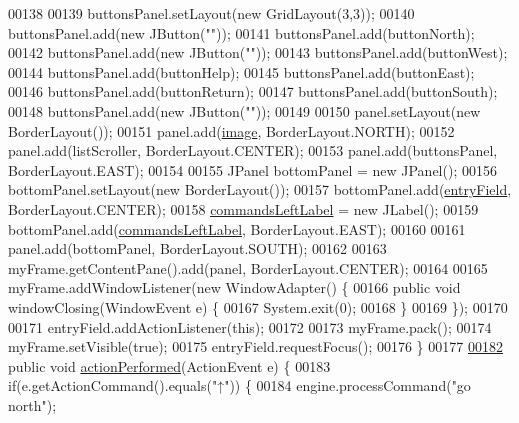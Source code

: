 \begin{DoxyCode}
00138 
00139         buttonsPanel.setLayout(\textcolor{keyword}{new} GridLayout(3,3));
00140         buttonsPanel.add(\textcolor{keyword}{new} JButton(\textcolor{stringliteral}{""}));
00141         buttonsPanel.add(buttonNorth);
00142         buttonsPanel.add(\textcolor{keyword}{new} JButton(\textcolor{stringliteral}{""}));
00143         buttonsPanel.add(buttonWest);
00144         buttonsPanel.add(buttonHelp);
00145         buttonsPanel.add(buttonEast);
00146         buttonsPanel.add(buttonReturn);
00147         buttonsPanel.add(buttonSouth);
00148         buttonsPanel.add(\textcolor{keyword}{new} JButton(\textcolor{stringliteral}{""}));
00149 
00150         panel.setLayout(\textcolor{keyword}{new} BorderLayout());
00151         panel.add(\hyperlink{classUserInterface_a0d115eb19b54f3e002ec6aa0fcfb1db4}{image}, BorderLayout.NORTH);
00152         panel.add(listScroller, BorderLayout.CENTER);
00153         panel.add(buttonsPanel, BorderLayout.EAST);
00154 
00155         JPanel bottomPanel = \textcolor{keyword}{new} JPanel();
00156         bottomPanel.setLayout(\textcolor{keyword}{new} BorderLayout());
00157         bottomPanel.add(\hyperlink{classUserInterface_a940367d996e9e7ad6e1fa1abfe35128b}{entryField}, BorderLayout.CENTER);
00158         \hyperlink{classUserInterface_a88813d21f37fc65c1afae2250acd06d0}{commandsLeftLabel} = \textcolor{keyword}{new} JLabel();
00159         bottomPanel.add(\hyperlink{classUserInterface_a88813d21f37fc65c1afae2250acd06d0}{commandsLeftLabel}, BorderLayout.EAST);
00160 
00161         panel.add(bottomPanel, BorderLayout.SOUTH);
00162 
00163         myFrame.getContentPane().add(panel, BorderLayout.CENTER);
00164 
00165         myFrame.addWindowListener(\textcolor{keyword}{new} WindowAdapter() \{
00166             \textcolor{keyword}{public} \textcolor{keywordtype}{void} windowClosing(WindowEvent e) \{
00167                 System.exit(0);
00168             \}
00169         \});
00170 
00171         entryField.addActionListener(\textcolor{keyword}{this});
00172 
00173         myFrame.pack();
00174         myFrame.setVisible(\textcolor{keyword}{true});
00175         entryField.requestFocus();
00176     \}
00177 
\hypertarget{UserInterface_8java_source_l00182}{}\hyperlink{classUserInterface_a0a1ee40a4dbca4aeee002c3d0537c7d5}{00182}     \textcolor{keyword}{public} \textcolor{keywordtype}{void} \hyperlink{classUserInterface_a0a1ee40a4dbca4aeee002c3d0537c7d5}{actionPerformed}(ActionEvent e) \{
00183         \textcolor{keywordflow}{if}(e.getActionCommand().equals(\textcolor{stringliteral}{"↑"})) \{
00184             engine.processCommand(\textcolor{stringliteral}{"go north"});

\end{DoxyCode}
